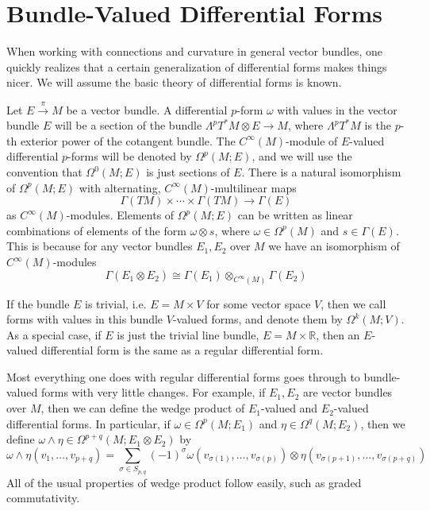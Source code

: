 \section{Bundle-Valued Differential Forms}


When working with connections and curvature in general vector bundles, one quickly realizes that a certain generalization of differential forms makes things nicer. We will assume the basic theory of differential forms is known.

Let $E \stackrel{\pi}{\rightarrow} M$ be a vector bundle. A differential $p$-form $\omega$ with values in the vector bundle $E$ will be a section of the bundle $\Lambda^p T^* M \otimes E \rightarrow M$, where $\Lambda^p T^* M$ is the $p$-th exterior power of the cotangent bundle. The $C^\infty(M)$-module of $E$-valued differential $p$-forms will be denoted by $\Omega^p(M;E)$, and we will use the convention that $\Omega^0(M;E)$ is just sections of $E$. There is a natural isomorphism of $\Omega^p(M;E)$ with alternating, $C^\infty(M)$-multilinear maps
\begin{equation}
\label{characterization of forms}
\Gamma(TM) \times \cdots \times \Gamma(TM) \rightarrow \Gamma(E)
\end{equation}
as $C^\infty(M)$-modules. Elements of $\Omega^p(M;E)$ can be written as linear combinations of elements of the form $\omega \otimes s$, where $\omega \in \Omega^p(M)$ and $s \in \Gamma(E)$. This is because for any vector bundles $E_1,E_2$ over $M$ we have an isomorphism of $C^\infty(M)$-modules
\[ \Gamma(E_1 \otimes E_2) \cong \Gamma(E_1) \otimes_{C^\infty(M)} \Gamma(E_2) \]

If the bundle $E$ is trivial, i.e. $E = M \times V$ for some vector space $V$, then we call forms with values in this bundle $V$-valued forms, and denote them by $\Omega^k(M;V)$. As a special case, if $E$ is just the trivial line bundle, $E = M \times \mathbb R$, then an $E$-valued differential form is the same as a regular differential form. 

Most everything one does with regular differential forms goes through to bundle-valued forms with very little changes. For example, if $E_1,E_2$ are vector bundles over $M$, then we can define the wedge product of $E_1$-valued and $E_2$-valued differential forms. In particular, if $\omega \in \Omega^p(M;E_1)$ and $\eta \in \Omega^q(M;E_2)$, then we define $\omega \wedge \eta \in \Omega^{p+q}(M;E_1 \otimes E_2)$ by
\[ \omega \wedge \eta(v_1, \ldots, v_{p+q}) = \sum_{\sigma \in S_{p,q}} (-1)^\sigma \omega(v_{\sigma(1)},\ldots,v_{\sigma(p)}) \otimes \eta(v_{\sigma(p+1)},\ldots,v_{\sigma(p+q)}) \]
All of the usual properties of wedge product follow easily, such as graded commutativity. 

